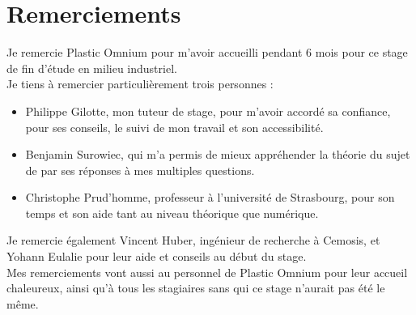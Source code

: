 \chapter*{Remerciements}
Je remercie Plastic Omnium pour m'avoir accueilli pendant 6 mois pour ce stage de fin d'étude en milieu industriel.\\

Je tiens à remercier particulièrement trois personnes :\\
\begin{itemize}
\item Philippe Gilotte, mon tuteur de stage, pour m'avoir accordé sa confiance, pour ses conseils, le suivi de mon travail et son accessibilité.\\
\item Benjamin Surowiec, qui m'a permis de mieux appréhender la théorie du sujet de par ses réponses à mes multiples questions.\\
\item Christophe Prud'homme, professeur à l'université de Strasbourg, pour son temps et son aide tant au niveau théorique que numérique.\\
\end{itemize}

Je remercie également Vincent Huber, ingénieur de recherche à Cemosis, et Yohann Eulalie pour leur aide et conseils au début du stage.\\

Mes remerciements vont aussi au personnel de Plastic Omnium pour leur accueil chaleureux, ainsi qu'à tous les stagiaires sans qui ce stage n'aurait pas été le même.


